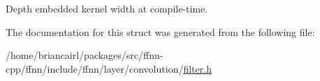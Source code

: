 Depth embedded kernel width at compile-\/time. 



The documentation for this struct was generated from the following file\-:\begin{DoxyCompactItemize}
\item 
/home/briancairl/packages/src/ffnn-\/cpp/ffnn/include/ffnn/layer/convolution/\hyperlink{filter_8h}{filter.\-h}\end{DoxyCompactItemize}
